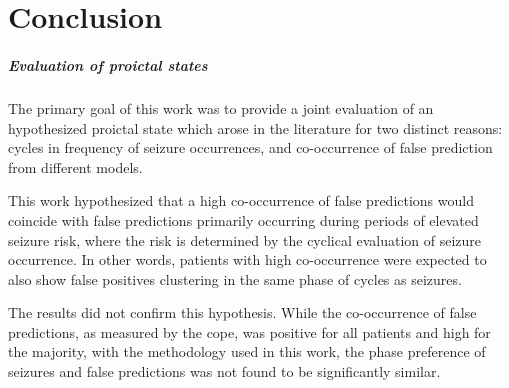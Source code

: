 \chapter{Conclusion}\label{ch:conclusion}



\paragraph{Evaluation of proictal states}
The primary goal of this work was to provide a joint evaluation of an hypothesized proictal state which arose in the literature for two distinct reasons: cycles in frequency of seizure occurrences, and co-occurrence of false prediction from different models.

This work hypothesized that a high co-occurrence of false predictions would coincide with false predictions primarily occurring during periods of elevated seizure risk, where the risk is determined by the cyclical evaluation of seizure occurrence.
In other words, patients with high co-occurrence were expected to also show false positives clustering in the same phase of cycles as seizures.

The results did not confirm this hypothesis. 
While the co-occurrence of false predictions, as measured by the \gls{cope}, was positive for all patients and high for the majority, with the methodology used in this work, the phase preference of seizures and false predictions was not found to be significantly similar.

